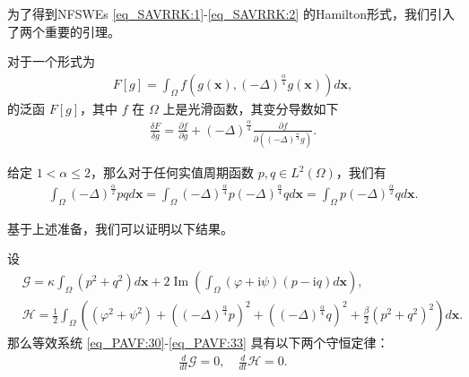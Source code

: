 为了得到NFSWEs \eqref{eq_SAVRRK:1}-\eqref{eq_SAVRRK:2} 的Hamilton形式，我们引入了两个重要的引理。

\begin{lemma}\label{lem_PAVF:2}
 对于一个形式为
\begin{align}\label{eq_PAVF:25}
F[g]=\int_{\Omega} f\left(g(\boldsymbol{x}),(-\Delta)^{\frac{\alpha}{4}} g(\boldsymbol{x})\right) d \boldsymbol{x},
\end{align}
的泛函 $F[g]$，其中 $f$ 在 $\Omega$ 上是光滑函数，其变分导数如下
\begin{align}\label{eq_PAVF:26}
\frac{\delta F}{\delta g}=\frac{\partial f}{\partial g}+(-\Delta)^{\frac{\alpha}{4}} \frac{\partial f}{\partial\left((-\Delta)^{\frac{\alpha}{4}} g\right)} .
\end{align}
\end{lemma}

\begin{lemma}\label{lem_PAVF:1}
 给定 $1<\alpha \leq 2$，那么对于任何实值周期函数 $p, q \in L^{2}(\Omega)$，我们有
\begin{align}\label{eq_PAVF:22}
\int_{\Omega}(-\Delta)^{\frac{\alpha}{2}} p q d \boldsymbol{x}=\int_{\Omega}(-\Delta)^{\frac{\alpha}{4}} p(-\Delta)^{\frac{\alpha}{4}} q d \boldsymbol{x}=\int_{\Omega} p(-\Delta)^{\frac{\alpha}{2}} q d \boldsymbol{x}.
\end{align}
\end{lemma}

基于上述准备，我们可以证明以下结果。

\begin{theorem}	\label{thm_PAVF:2_1}
设
\begin{align}
&\mathcal{G}=\kappa\int_{\Omega}(p^2+q^2) d \boldsymbol{x}+2\operatorname{Im}(\int_{\Omega}(\varphi+\mathrm{i}\psi)(p-\mathrm{i}q)d \boldsymbol{x}),\label{eq_PAVF:34} \\
&\mathcal{H}=\frac{1}{2}\int_{\Omega}\left((\varphi^2+\psi^2)+\left((-\Delta)^{\frac{\alpha}{4}} p\right)^{2}+\left((-\Delta)^{\frac{\alpha}{4}} q\right)^{2}+\frac{\beta}{2}(p^2+q^2)^{2}\right) d \boldsymbol{x}.\label{eq_PAVF:35}
\end{align}
那么等效系统 \eqref{eq_PAVF:30}-\eqref{eq_PAVF:33} 具有以下两个守恒定律：
\begin{align}
\frac{d}{d t} \mathcal{G}=0, \quad \frac{d}{d t} \mathcal{H}=0.
\end{align}
\end{theorem}

